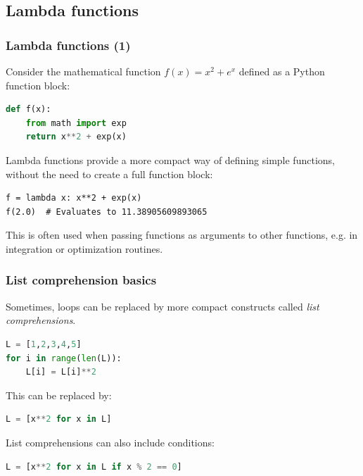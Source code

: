 \subsection{Lambda functions}
\begin{frame}[fragile]
  \frametitle{Lambda functions (1)}
  Consider the mathematical function \(f(x) = x^2+e^x\) defined as a Python function block:
  \begin{lstlisting}[language=Python]
def f(x):
    from math import exp
    return x**2 + exp(x)
  \end{lstlisting}
  \pause
  Lambda functions provide a more compact way of defining simple functions, without the need to create a full function block:
  \begin{lstlisting}
f = lambda x: x**2 + exp(x)
f(2.0)  # Evaluates to 11.38905609893065
  \end{lstlisting}
  \pause
  This is often used when passing functions as arguments to other functions, e.g. in integration or optimization routines.
\end{frame}

\begin{frame}[fragile]
  \frametitle{List comprehension basics}
  Sometimes, loops can be replaced by more compact constructs called \emph{list comprehensions}.
  \begin{lstlisting}[language=Python]
L = [1,2,3,4,5]
for i in range(len(L)):
    L[i] = L[i]**2
  \end{lstlisting}
  \pause
  This can be replaced by:
  \begin{lstlisting}[language=Python]
L = [x**2 for x in L]
  \end{lstlisting}
  \pause
  List comprehensions can also include conditions:
  \begin{lstlisting}[language=Python]
L = [x**2 for x in L if x % 2 == 0]
  \end{lstlisting}
\end{frame}

